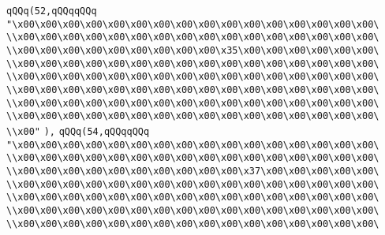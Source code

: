 \verb|qQQq(52,qQQqqQQq|\newline
\verb|"\x00\x00\x00\x00\x00\x00\x00\x00\x00\x00\x00\x00\x00\x00\x00\x00\|\newline
\verb|\\x00\x00\x00\x00\x00\x00\x00\x00\x00\x00\x00\x00\x00\x00\x00\x00\|\newline
\verb|\\x00\x00\x00\x00\x00\x00\x00\x00\x00\x35\x00\x00\x00\x00\x00\x00\|\newline
\verb|\\x00\x00\x00\x00\x00\x00\x00\x00\x00\x00\x00\x00\x00\x00\x00\x00\|\newline
\verb|\\x00\x00\x00\x00\x00\x00\x00\x00\x00\x00\x00\x00\x00\x00\x00\x00\|\newline
\verb|\\x00\x00\x00\x00\x00\x00\x00\x00\x00\x00\x00\x00\x00\x00\x00\x00\|\newline
\verb|\\x00\x00\x00\x00\x00\x00\x00\x00\x00\x00\x00\x00\x00\x00\x00\x00\|\newline
\verb|\\x00\x00\x00\x00\x00\x00\x00\x00\x00\x00\x00\x00\x00\x00\x00\x00\|\newline
\verb|\\x00"|\newline
\verb|),|\newline
\verb|qQQq(54,qQQqqQQq|\newline
\verb|"\x00\x00\x00\x00\x00\x00\x00\x00\x00\x00\x00\x00\x00\x00\x00\x00\|\newline
\verb|\\x00\x00\x00\x00\x00\x00\x00\x00\x00\x00\x00\x00\x00\x00\x00\x00\|\newline
\verb|\\x00\x00\x00\x00\x00\x00\x00\x00\x00\x00\x37\x00\x00\x00\x00\x00\|\newline
\verb|\\x00\x00\x00\x00\x00\x00\x00\x00\x00\x00\x00\x00\x00\x00\x00\x00\|\newline
\verb|\\x00\x00\x00\x00\x00\x00\x00\x00\x00\x00\x00\x00\x00\x00\x00\x00\|\newline
\verb|\\x00\x00\x00\x00\x00\x00\x00\x00\x00\x00\x00\x00\x00\x00\x00\x00\|\newline
\verb|\\x00\x00\x00\x00\x00\x00\x00\x00\x00\x00\x00\x00\x00\x00\x00\x00\|\newline

